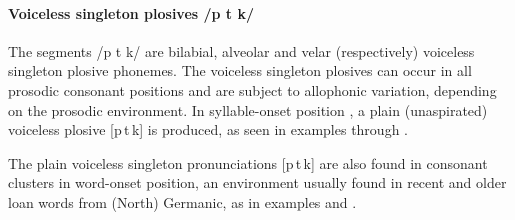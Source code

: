 \paragraph{Voiceless singleton plosives /p t k/}\label{ptk}
The segments /p t k/ are bilabial, alveolar and velar (respectively) voiceless singleton plosive phonemes. %
The voiceless singleton plosives can occur in all prosodic consonant positions and are subject to allophonic variation, depending on the prosodic environment. In syllable-onset position%
, a plain (unaspirated) voiceless plosive [p\,t\,k] is produced, as seen in examples  through . %

The plain voiceless singleton pronunciations [p\,t\,k] %
are also found in consonant clusters in word-onset position, an environment usually found in recent and older loan words from (North) Germanic, as in examples  and . %

